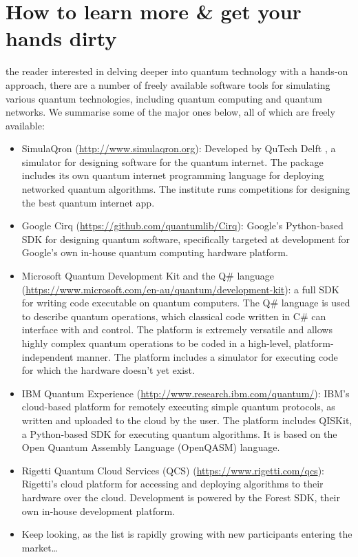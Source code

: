 %
%

\section{How to learn more \& get your hands dirty}

 the reader interested in delving deeper into quantum technology with a hands-on approach, there are a number of freely available software tools for simulating various quantum technologies, including quantum computing and quantum networks. We summarise some of the major ones below, all of which are freely available:

\begin{itemize}
	\item SimulaQron (\href{http://www.simulaqron.org}{http://www.simulaqron.org}): Developed by QuTech Delft \cite{bib:AxelDahlbergQron}, a simulator for designing software for the quantum internet. The package includes its own quantum internet programming language for deploying networked quantum algorithms. The institute runs competitions for designing the best quantum internet app.
	\item Google Cirq (\href{https://github.com/quantumlib/Cirq}{https://github.com/quantumlib/Cirq}): Google's Python-based SDK for designing quantum software, specifically targeted at development for Google's own in-house quantum computing hardware platform.
	\item Microsoft Quantum Development Kit and the Q\# language (\href{https://www.microsoft.com/en-au/quantum/development-kit}{https://www.microsoft.com/en-au/quantum/development-kit}): a full SDK for writing code executable on quantum computers. The Q\# language is used to describe quantum operations, which classical code written in C\# can interface with and control. The platform is extremely versatile and allows highly complex quantum operations to be coded in a high-level, platform-independent manner. The platform includes a simulator for executing code for which the hardware doesn't yet exist.
	\item IBM Quantum Experience (\href{http://www.research.ibm.com/quantum/}{http://www.research.ibm.com/quantum/}): IBM's cloud-based platform for remotely executing simple quantum protocols, as written and uploaded to the cloud by the user. The platform includes QISKit, a Python-based SDK for executing quantum algorithms. It is based on the Open Quantum Assembly Language (OpenQASM) language.
	\item Rigetti Quantum Cloud Services (QCS) (\href{https://www.rigetti.com/qcs}{https://www.rigetti.com/qcs}): Rigetti's cloud platform for accessing and deploying algorithms to their hardware over the cloud. Development is powered by the Forest SDK, their own in-house development platform.
	\item Keep looking, as the list is rapidly growing with new participants entering the market\ldots
\end{itemize}
